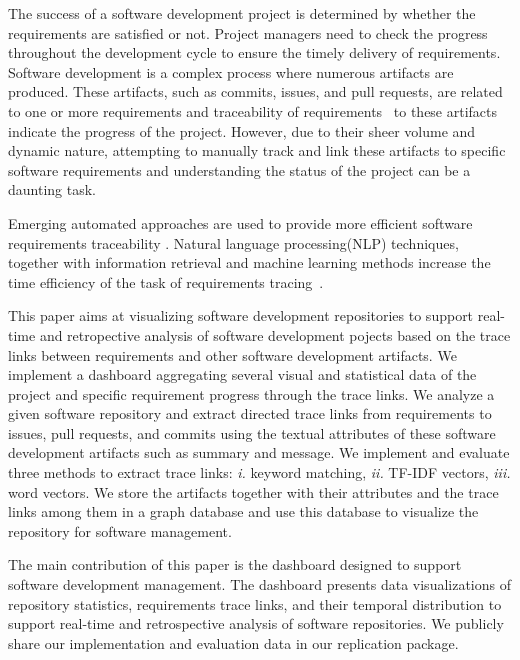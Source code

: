 %
The success of a software development project is determined by whether the requirements are satisfied or not. Project managers need to check the progress throughout the development cycle to ensure the timely delivery of requirements. Software development is a complex process where numerous artifacts are produced. These artifacts, such as commits, issues, and pull requests, are related to one or more requirements and traceability of requirements~\cite{gotel-1994} to these artifacts indicate the progress of the project. However, due to their sheer volume and dynamic nature, attempting to manually track and link these artifacts to specific software requirements and understanding the status of the project can be a daunting task.

%
Emerging automated approaches are used to provide more efficient software requirements traceability \cite{cleland-huang-2007,mills-2017,VANOOSTEN2023107226,bonner-2023,deen-2023}. Natural language processing(NLP) techniques, together with information retrieval and machine learning methods increase the time efficiency of the task of requirements tracing~\cite{cleland-huang-2007}.

%
This paper aims at visualizing software development repositories to support real-time and retropective analysis of software development pojects based on the trace links between requirements and other software development artifacts. We implement a dashboard aggregating several visual and statistical data of the project and specific requirement progress through the trace links. We analyze a given software repository and extract directed trace links from requirements to issues, pull requests, and commits using the textual attributes of these software development artifacts such as summary and message. We implement and evaluate three methods to extract trace links: \emph{i.} keyword matching, \emph{ii.} TF-IDF vectors, \emph{iii.} word vectors. We store the artifacts together with their attributes and the trace links among them in a graph database and use this database to visualize the repository for software management.

The main contribution of this paper is the dashboard designed to support software development management. The dashboard presents data visualizations of repository statistics, requirements trace links, and their temporal distribution to support real-time and retrospective analysis of software repositories. We publicly share our implementation and evaluation data in our replication package.















